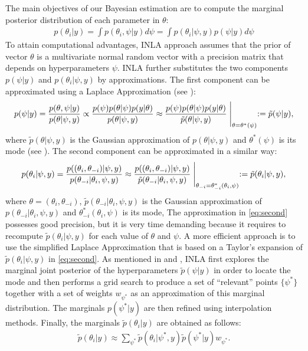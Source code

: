 \documentclass[12pt]{amsart}
\theoremstyle{plain}
\theoremstyle{definition}
\theoremstyle{remark}
\begin{document}
The main objectives of our Bayesian estimation are to compute the
marginal posterior distribution of each parameter in $\theta$:
\begin{align*}
  p(\theta_i|y) = \int p(\theta_i,\psi|y)d \psi = \int p(\theta_i|\psi,y)p(\psi|y)d \psi
\end{align*}
To attain computational advantages, INLA approach assumes that the prior of
vector $\theta$ is a multivariate normal random vector with a precision matrix
that depends on hyperparameters $\psi$. INLA further 
substitutes the two components $p(\psi|y)$ and $p(\theta_i|\psi,y)$ by approximations. The first component can be approximated using a
Laplace Approximation (see \cite{Tierney1986}):
\begin{align*}
  p(\psi|y)=\frac{p(\theta,\psi|y)}{p(\theta|\psi,y)}\propto \frac{p(\psi)p(\theta|\psi)p(y|\theta)}{p(\theta|\psi,y)}
            \approx  \frac{p(\psi)p(\theta|\psi)p(y|\theta)}{\tilde p(\theta|\psi,y)} \Biggm |_{\theta=\theta^*(\psi)} := \tilde p(\psi|y),
\end{align*}
where $\tilde p(\theta|\psi,y)$ is the Gaussian approximation of
$p(\theta|\psi,y)$ and $\theta^*(\psi)$ is its mode (see \cite{Rue2009}). The
second component can be approximated in a similar way:
\begin{equation}\label{eq:second}
  p(\theta_i|\psi,y)  =\frac{p((\theta_i,\theta_{-i})|\psi,y)}{p(\theta_{-i}|\theta_i,\psi,y)} %
   \approx \frac{p((\theta_i,\theta_{-i})|\psi,y)}{\tilde p(\theta_{-i}|\theta_i,\psi,y)} \Biggm |_{\theta_{-i}=\theta_{-i}^*(\theta_i,\psi)}:=\tilde p(\theta_i|\psi,y),
\end{equation}
where $\theta=(\theta_i,\theta_{-i})$, $\tilde p(\theta_{-i}|\theta_i,\psi,y)$ is the Gaussian approximation of
$p(\theta_{-i}|\theta_i,\psi,y)$ and $\theta_{-i}^*(\theta_i,\psi)$ is its mode,  
The approximation in \eqref{eq:second} possesses good precision, but it is very time demanding because it
requires to recompute $\tilde p(\theta_i|\psi,y)$ for each value of $\theta$ and $\psi$. A
more efficient approach is to use the simplified Laplace Approximation that is
based on a Taylor's expansion of $\tilde p(\theta_i|\psi,y)$ in 
\eqref{eq:second}. As mentioned in \cite{Rue2009} and \cite{Blangiardo2013},
INLA first explores the marginal joint posterior of the hyperparameters $\tilde
p(\psi | y)$ in order to locate the mode and then performs a grid search to 
produce a set of ``relevant'' points $\{\psi^*\}$ together with a set of weights
$w_{\psi^*}$ as an approximation of this marginal distribution. The marginals
$p(\psi^*|y)$ are then refined using interpolation methods. Finally, the marginals
$\tilde p(\theta_i|y)$ are obtained as follows:
\begin{align*}
  \tilde p(\theta_i|y) \approx \sum_{\psi^*}\tilde p(\theta_i|\psi^*,y)\tilde p(\psi^*|y)w_{\psi^*}.
\end{align*}
\end{document}
